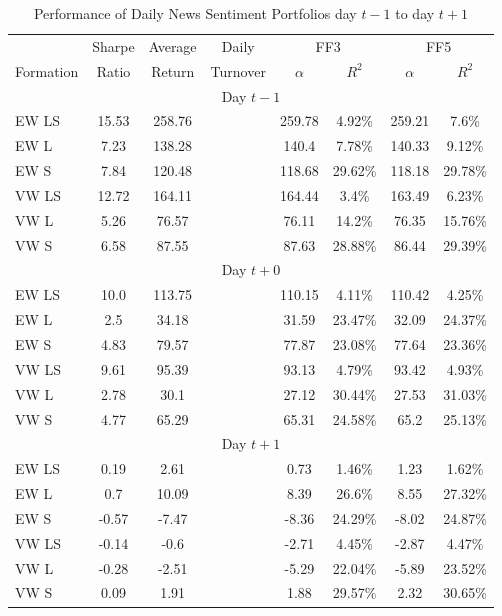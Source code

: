 \begin{table}[!ht]
\begin{center}
\begin{tabular}{lccccccc}
      \toprule
      & Sharpe &  Average & Daily & \multicolumn{2}{c}{FF3} & \multicolumn{2}{c}{FF5} \\
      \cmidrule(lr){5-6}
      \cmidrule(lr){7-8}
      Formation & Ratio & Return & Turnover & $\alpha$ & $R^2$ & $\alpha$ & $R^2$ \\
      \midrule
      \multicolumn{8}{c}{Day $t-1$} \\
      EW LS & 15.53 & 258.76 & & 259.78 & 4.92\% & 259.21 & 7.6\% \\
      EW L & 7.23 & 138.28 & & 140.4 & 7.78\% & 140.33 & 9.12\% \\
      EW S & 7.84 & 120.48 & & 118.68 & 29.62\% & 118.18 & 29.78\% \\
      VW LS & 12.72 & 164.11 & & 164.44 & 3.4\% & 163.49 & 6.23\% \\
      VW L & 5.26 & 76.57 & & 76.11 & 14.2\% & 76.35 & 15.76\% \\
      VW S & 6.58 & 87.55 & & 87.63 & 28.88\% & 86.44 & 29.39\% \\
      \multicolumn{8}{c}{Day $t+0$} \\
      EW LS & 10.0 & 113.75 & & 110.15 & 4.11\% & 110.42 & 4.25\% \\
      EW L & 2.5 & 34.18 & & 31.59 & 23.47\% & 32.09 & 24.37\% \\
      EW S & 4.83 & 79.57 & & 77.87 & 23.08\% & 77.64 & 23.36\% \\
      VW LS & 9.61 & 95.39 & & 93.13 & 4.79\% & 93.42 & 4.93\% \\
      VW L & 2.78 & 30.1 & & 27.12 & 30.44\% & 27.53 & 31.03\% \\
      VW S & 4.77 & 65.29 & & 65.31 & 24.58\% & 65.2 & 25.13\% \\
      \multicolumn{8}{c}{Day $t+1$} \\
      EW LS & 0.19 & 2.61 & & 0.73 & 1.46\% & 1.23 & 1.62\% \\
      EW L & 0.7 & 10.09 & & 8.39 & 26.6\% & 8.55 & 27.32\% \\
      EW S & -0.57 & -7.47 & & -8.36 & 24.29\% & -8.02 & 24.87\% \\
      VW LS & -0.14 & -0.6 & & -2.71 & 4.45\% & -2.87 & 4.47\% \\
      VW L & -0.28 & -2.51 & & -5.29 & 22.04\% & -5.89 & 23.52\% \\
      VW S & 0.09 & 1.91 & & 1.88 & 29.57\% & 2.32 & 30.65\% \\
      \bottomrule
\end{tabular}
\caption{Performance of Daily News Sentiment Portfolios day $t-1$ to day $t+1$}
\label{portfolio-performance-day-1}
\end{center}
\end{table}

